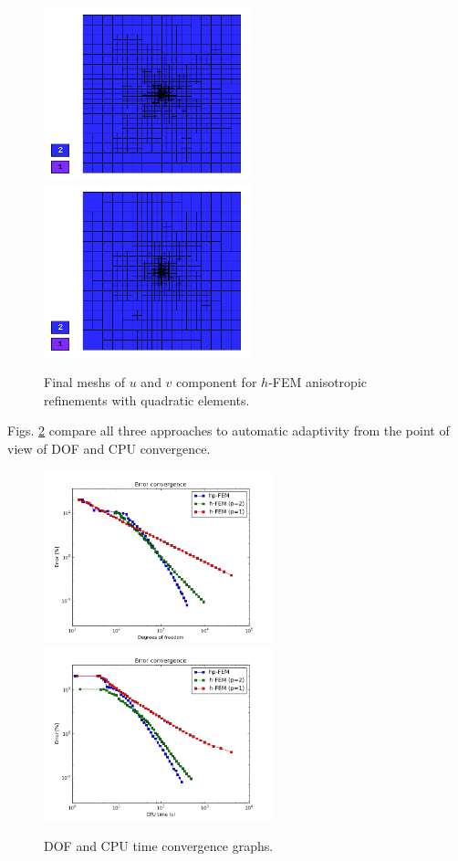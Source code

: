 \begin{figure}[!ht]
\centering
\includegraphics[height=5cm]{nist/nist-3/mesh_u_h2_aniso.png}\ \
\includegraphics[height=5cm]{nist/nist-3/mesh_v_h2_aniso.png}
\caption{Final meshs of $u$ and $v$ component for $h$-FEM anisotropic refinements with quadratic elements.}
\label{fig:nist-3-h2-aniso}
\end{figure}

Figs. \ref{fig:nist-3-conv} compare all
three approaches to automatic adaptivity from the point
of view of DOF and CPU convergence.

\begin{figure}[!ht]
\centering
\includegraphics[height=5cm]{nist/nist-3/conv_dof_aniso.png}\ \
\includegraphics[height=5cm]{nist/nist-3/conv_cpu_aniso.png}
\caption{DOF and CPU time convergence graphs.}
\label{fig:nist-3-conv}
\end{figure}

